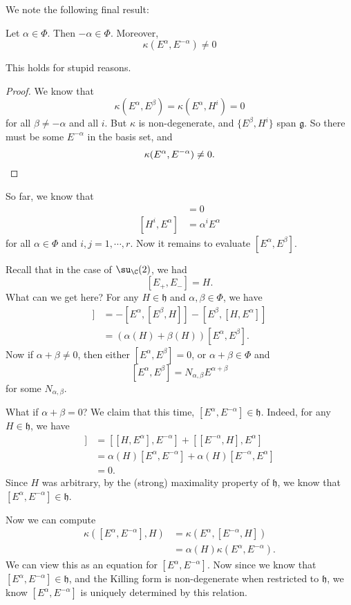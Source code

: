 \documentclass[a4paper]{article}
\begin{document}
We note the following final result:
\begin{lemma}
  Let $\alpha \in \Phi$. Then $-\alpha \in \Phi$. Moreover,
  \[
    \kappa(E^\alpha, E^{-\alpha}) \not= 0
  \]
\end{lemma}
This holds for stupid reasons.

\begin{proof}
  We know that
  \[
    \kappa(E^\alpha, E^\beta) = \kappa(E^\alpha, H^i) = 0
  \]
  for all $\beta \not= -\alpha$ and all $i$. But $\kappa$ is non-degenerate, and $\{E^\beta, H^i\}$ span $\mathfrak{g}$. So there must be some $E^{-\alpha}$ in the basis set, and
  \[
    \kappa(E^\alpha, E^{-\alpha}) \not= 0. \qedhere
  \]
\end{proof}

So far, we know that
\begin{align*}
  [H^i, H^j] &= 0\\
  [H^i, E^\alpha] &= \alpha^i E^\alpha
\end{align*}
for all $\alpha \in \Phi$ and $i, j = 1, \cdots, r$. Now it remains to evaluate $[E^\alpha, E^\beta]$.

Recall that in the case of $\su_\C(2)$, we had
\[
  [E_+, E_-] = H.
\]
What can we get here? For any $H \in \mathfrak{h}$ and $\alpha, \beta \in \Phi$, we have
\begin{align*}
  [H, [E^\alpha, E^\beta]] &= -[E^\alpha, [E^\beta, H]] - [E^\beta, [H, E^\alpha]]\\
  &= (\alpha(H)+ \beta(H))[E^\alpha, E^\beta].
\end{align*}
Now if $\alpha + \beta \not= 0$, then either $[E^\alpha, E^\beta] = 0$, or $\alpha + \beta \in \Phi$ and
\[
  [E^\alpha, E^\beta] = N_{\alpha, \beta} E^{\alpha + \beta}
\]
for some $N_{\alpha, \beta}$.

What if $\alpha + \beta = 0$? We claim that this time, $[E^\alpha, E^{-\alpha}] \in \mathfrak{h}$. Indeed, for any $H \in \mathfrak{h}$, we have
\begin{align*}
  [H, [E^\alpha, E^{-\alpha}]] &= [[H, E^\alpha], E^{-\alpha}] + [[E^{-\alpha}, H], E^\alpha]\\
  &= \alpha(H) [E^\alpha, E^{-\alpha}] + \alpha(H) [E^{-\alpha}, E^\alpha]\\
  &= 0.
\end{align*}
Since $H$ was arbitrary, by the (strong) maximality property of $\mathfrak{h}$, we know that $[E^\alpha, E^{-\alpha}] \in \mathfrak{h}$.

Now we can compute
\begin{align*}
  \kappa([E^\alpha, E^{-\alpha}], H) &= \kappa(E^\alpha, [E^{-\alpha}, H])\\
  &= \alpha(H) \kappa(E^\alpha, E^{-\alpha}).
\end{align*}
We can view this as an equation for $[E^\alpha, E^{-\alpha}]$. Now since we know that $[E^\alpha, E^{-\alpha}] \in \mathfrak{h}$, and the Killing form is non-degenerate when restricted to $\mathfrak{h}$, we know $[E^\alpha, E^{-\alpha}]$ is uniquely determined by this relation.
\end{document}
